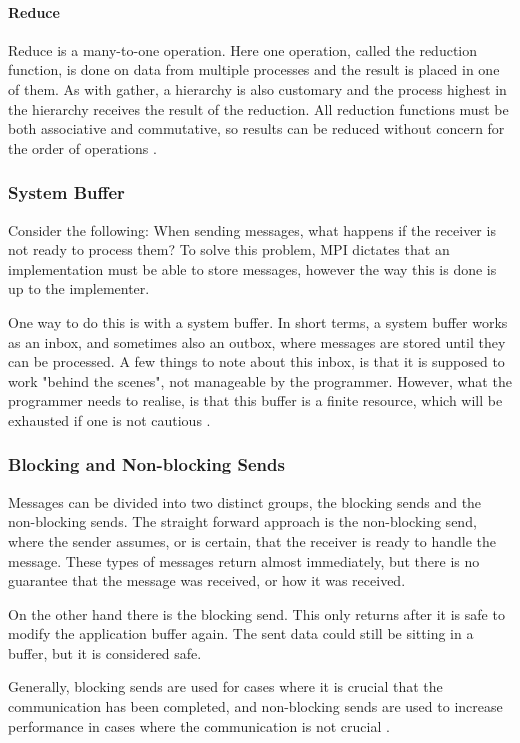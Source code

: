 \paragraph{Reduce}
Reduce is a many-to-one operation. Here one operation, called the reduction function, is done on data from multiple processes and the result is placed in one of them. As with gather, a hierarchy is also customary and the process highest in the hierarchy receives the result of the reduction. All reduction functions must be both associative and commutative, so results can be reduced without concern for the order of operations \cite{mpi1}.

\subsubsection{System Buffer}
Consider the following: When sending messages, what happens if the receiver is not ready to process them? To solve this problem, MPI dictates that an implementation must be able to store messages, however the way this is done is up to the implementer.

One way to do this is with a system buffer. In short terms, a system buffer works as an inbox, and sometimes also an outbox, where messages are stored until they can be processed. A few things to note about this inbox, is that it is supposed to work "behind the scenes", not manageable by the programmer. However, what the programmer needs to realise, is that this buffer is a finite resource, which will be exhausted if one is not cautious \cite{compLLNLMPI}.

\subsubsection{Blocking and Non-blocking Sends}
Messages can be divided into two distinct groups, the blocking sends and the non-blocking sends. The straight forward approach is the non-blocking send, where the sender assumes, or is certain, that the receiver is ready to handle the message. These types of messages return almost immediately, but there is no guarantee that the message was received, or how it was received.

On the other hand there is the blocking send. This only returns after it is safe to modify the application buffer again. The sent data could still be sitting in a buffer, but it is considered safe.

Generally, blocking sends are used for cases where it is crucial that the communication has been completed, and non-blocking sends are used to increase performance in cases where the communication is not crucial \cite{compLLNLMPI}.


